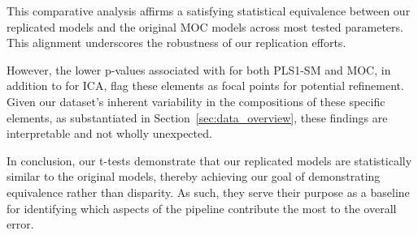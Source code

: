 This comparative analysis affirms a satisfying statistical equivalence between our replicated models and the original MOC models across most tested parameters.
This alignment underscores the robustness of our replication efforts.

However, the lower p-values associated with  for both PLS1-SM and MOC, in addition to  for ICA, flag these elements as focal points for potential refinement.
Given our dataset's inherent variability in the compositions of these specific elements, as substantiated in Section~\ref{sec:data_overview}, these findings are interpretable and not wholly unexpected.

In conclusion, our t-tests demonstrate that our replicated models are statistically similar to the original models, thereby achieving our goal of demonstrating equivalence rather than disparity.
As such, they serve their purpose as a baseline for identifying which aspects of the pipeline contribute the most to the overall error.

